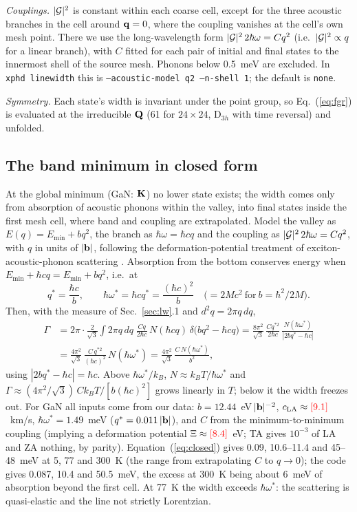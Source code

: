 \emph{Couplings.} $|\mathcal{G}|^2$ is constant within each coarse cell, except for the
three acoustic branches in the cell around $\mathbf{q}=0$, where the coupling vanishes
at the cell's own mesh point. There we use the long-wavelength form
$|\mathcal{G}|^2\,2\hbar\omega=Cq^2$ (i.e.\ $|\mathcal{G}|^2\propto q$ for a linear branch), with
$C$ fitted for each pair of initial and final states to the innermost shell of
the source mesh. Phonons below 0.5~meV are excluded. In \texttt{xphd linewidth}
this is \texttt{--acoustic-model q2 --n-shell 1}; the default is \texttt{none}.

\emph{Symmetry.} Each state's width is invariant under the point group, so
Eq.~(\ref{eq:fgr}) is evaluated at the irreducible $\mathbf{Q}$ (61 for $24\times24$,
D$_{3h}$ with time reversal) and unfolded.

\subsection{The band minimum in closed form}
At the global minimum (GaN: $\mathbf{K}$) no lower state exists; the width comes only
from absorption of acoustic phonons within the valley, into final states inside
the first mesh cell, where band and coupling are extrapolated. Model the valley
as $E(q)=E_{\min}+bq^2$, the branch as $\hbar\omega=\hbar cq$ and the coupling
as $|\mathcal{G}|^2\,2\hbar\omega=Cq^2$, with $q$ in units of $|\mathbf{b}|$, following the
deformation-potential treatment of exciton-acoustic-phonon scattering
\cite{Kaasbjerg2013,Rudin1990,Selig2016}. Absorption from the bottom conserves
energy when $E_{\min}+\hbar cq=E_{\min}+bq^2$, i.e.\ at
\begin{equation}
q^*=\frac{\hbar c}{b},\qquad \hbar\omega^*=\hbar cq^*=\frac{(\hbar c)^2}{b}
\quad\bigl(=2Mc^2\ \text{for}\ b=\hbar^2/2M\bigr).
\end{equation}
Then, with the measure of Sec.~\ref{sec:lw}.1 and $d^2q=2\pi q\,dq$,
\begin{align}
\Gamma&=2\pi\cdot\frac{2}{\sqrt3}\int 2\pi q\,dq\;\frac{Cq}{2\hbar c}\,N(\hbar cq)\,
\delta\bigl(bq^2-\hbar cq\bigr)
=\frac{8\pi^2}{\sqrt3}\,\frac{Cq^{*2}}{2\hbar c}\,\frac{N(\hbar\omega^*)}{|2bq^*-\hbar c|}\nonumber\\
&=\frac{4\pi^2}{\sqrt3}\,\frac{C\,q^{*2}}{(\hbar c)^2}\,N(\hbar\omega^*)
=\frac{4\pi^2}{\sqrt3}\,\frac{C\,N(\hbar\omega^*)}{b^2},
\label{eq:closed}
\end{align}
using $|2bq^*-\hbar c|=\hbar c$. Above $\hbar\omega^*/k_B$,
$N\approx k_BT/\hbar\omega^*$ and $\Gamma\approx(4\pi^2/\sqrt3)\,Ck_BT/[b(\hbar c)^2]$
grows linearly in $T$; below it the width freezes out. For GaN all inputs come
from our data: $b=12.44$~eV$\,|\mathbf{b}|^{-2}$, $c_{\mathrm{LA}}\approx\textcolor{red}{[9.1]}$~km/s,
$\hbar\omega^*=1.49$~meV ($q^*=0.011\,|\mathbf{b}|$), and $C$ from the minimum-to-minimum
coupling (implying a deformation potential $\Xi\approx\textcolor{red}{[8.4]}$~eV; TA gives
$10^{-3}$ of LA and ZA nothing, by parity). Equation~(\ref{eq:closed}) gives
0.09, 10.6--11.4 and 45--48~meV at 5, 77 and 300~K (the range from extrapolating
$C$ to $q\to0$); the code gives 0.087, 10.4 and 50.5~meV, the excess at 300~K
being about 6~meV of absorption beyond the first cell. At 77~K the width exceeds
$\hbar\omega^*$: the scattering is quasi-elastic and the line not strictly
Lorentzian.


